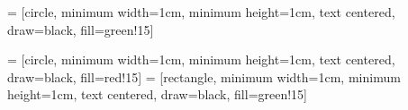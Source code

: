 




 = [circle, minimum width=1cm, minimum height=1cm, text centered, draw=black, fill=green!15]

 = [circle, minimum width=1cm, minimum height=1cm, text centered, draw=black, fill=red!15]
 = [rectangle, minimum width=1cm, minimum height=1cm, text centered, draw=black, fill=green!15]
\usepackage{pstricks}
\usepackage{auto-pst-pdf}

